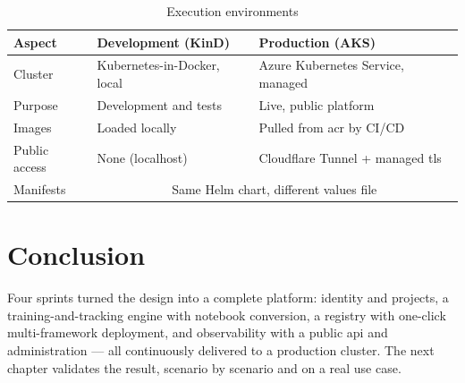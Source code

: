 \begin{table}[H]\centering
\renewcommand{\arraystretch}{1.2}
\caption{Execution environments}\label{tab:environments}
\small
\begin{tabularx}{\textwidth}{|>{\raggedright\arraybackslash}p{3.4cm}|X|X|}
\hline
\rowcolor{primary!15}
\textbf{Aspect} & \textbf{Development (KinD)} & \textbf{Production (AKS)}\\
\hline
Cluster & Kubernetes-in-Docker, local & Azure Kubernetes Service, managed\\ \hline
Purpose & Development and tests & Live, public platform\\ \hline
Images & Loaded locally & Pulled from \gls{acr} by CI/CD\\ \hline
Public access & None (localhost) & Cloudflare Tunnel + managed \gls{tls}\\ \hline
Manifests & \multicolumn{2}{c|}{Same Helm chart, different values file}\\ \hline
\end{tabularx}
\end{table}

\section{Conclusion}
Four sprints turned the design into a complete platform: identity and
projects, a training-and-tracking engine with notebook conversion, a registry
with one-click multi-framework deployment, and observability with a public
\gls{api} and administration --- all continuously delivered to a production
cluster. The next chapter validates the result, scenario by scenario and on a
real use case.
